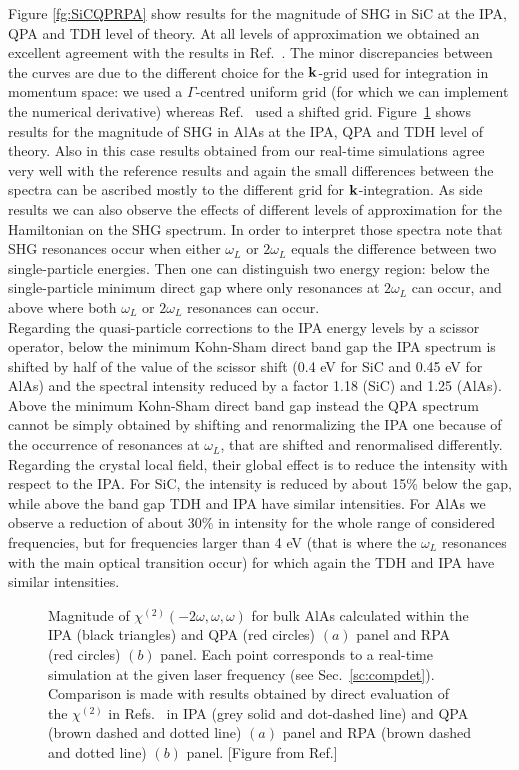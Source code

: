 Figure \ref{fg:SiCQPRPA} show results for the magnitude of SHG in SiC at the IPA, QPA and TDH level of theory. 
At all levels of approximation we obtained an excellent agreement with the results in Ref.~\cite{PhysRevB.82.235201}. The minor discrepancies between the curves are due to the different choice for the ${\bf k}$-grid used for integration in momentum space: we used a $\Gamma$-centred uniform grid (for which we can implement the numerical derivative) whereas Ref.~\cite{PhysRevB.82.235201} used a shifted grid. Figure~\ref{fg:AlAsQPRPA} shows results for the magnitude of SHG in AlAs at the IPA, QPA and TDH level of theory. 
Also in this case results obtained from our real-time simulations agree very well with the reference results and again the small differences between the spectra can be ascribed mostly to the different grid for ${\bf k}$-integration.
As side results we can also observe the effects of different levels of approximation for the Hamiltonian on the SHG spectrum. In order to interpret those spectra note that SHG resonances occur when either $\omega_L$ or $2\omega_L$ equals the difference between two single-particle energies. Then one can distinguish two energy region: below the single-particle minimum direct gap where only resonances at $2\omega_L$ can occur, and above where both $\omega_L$ or $2\omega_L$ resonances  can occur.\\
Regarding the quasi-particle corrections to the IPA energy levels by a scissor operator, below the minimum Kohn-Sham direct band gap the IPA spectrum is shifted by half of the value of the scissor shift (0.4 eV for SiC and 0.45 eV for AlAs) and the spectral intensity reduced by a factor 1.18 (SiC) and  1.25 (AlAs). Above the minimum Kohn-Sham direct band gap instead the QPA spectrum cannot be simply obtained by shifting and renormalizing the IPA one because of the occurrence of resonances at $\omega_{L}$, that are shifted and renormalised differently.\\  
Regarding the crystal local field, their global effect is to reduce the intensity with respect to the IPA. For SiC, the intensity is reduced by about 15\% below the gap, while above the band gap TDH and IPA have similar intensities. For AlAs we observe a reduction of about 30\% in intensity for the whole range of considered frequencies, but for frequencies larger than 4 eV (that is where the $\omega_L$ resonances with the main optical transition occur) for which again the TDH and IPA have similar intensities.
\begin{figure}[ht]
\centering
{}
\caption{\footnotesize{Magnitude of $\chi^{(2)}(-2\omega,\omega,\omega)$ for bulk AlAs calculated within the IPA (black triangles) and QPA (red circles) $(a)$ panel and RPA (red circles) $(b)$ panel. Each point corresponds to a real-time simulation at the given laser frequency (see Sec.~\ref{sc:compdet}). Comparison is made with results obtained \ai by direct evaluation of the $\chi^{(2)}$ in Refs.~\cite{PhysRevB.82.235201,PSSB.427.1984} in IPA (grey solid and dot-dashed line) and QPA (brown dashed and dotted line) $(a)$ panel and RPA (brown dashed and dotted line) $(b)$ panel. \label{fg:AlAsQPRPA} [Figure from Ref.\cite{nloptics2013}] }}
\end{figure}

